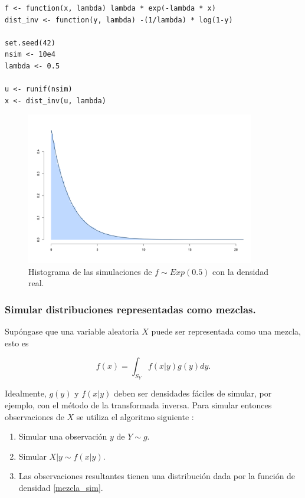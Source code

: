 \documentclass[11pt,a4paper]{article}
\begin{document}
\begin{lstlisting}
f <- function(x, lambda) lambda * exp(-lambda * x)
dist_inv <- function(y, lambda) -(1/lambda) * log(1-y)

set.seed(42)
nsim <- 10e4
lambda <- 0.5

u <- runif(nsim)
x <- dist_inv(u, lambda)
\end{lstlisting}

\begin{figure}[h]
\centering\includegraphics[width=10cm]{transformada_inversa.png}
\caption{Histograma de las simulaciones de $f \sim Exp(0.5)$ con la densidad real.}
\label{fig:transformada_inversa}
\end{figure}

\subsubsection*{Simular distribuciones representadas como mezclas.} Supóngase que una variable aleatoria $X$ puede ser representada como una mezcla, esto es

\begin{equation}
f(x) = \int_{S_Y} f(x|y)g(y)dy.
\label{mezcla_sim}
\end{equation}

Idealmente, $g(y)$ y $f(x|y)$ deben ser densidades fáciles de simular, por ejemplo, con el método de la transformada inversa. Para simular entonces observaciones de $X$ se utiliza el algoritmo siguiente \citep{casella}:

\begin{enumerate}
\item Simular una observación $y$ de $Y\sim g$.\\
\item Simular $X|y \sim f(x|y)$.\\
\item Las observaciones resultantes tienen una distribución dada por la función de densidad \eqref{mezcla_sim}.\\
\end{enumerate}
\end{document}
